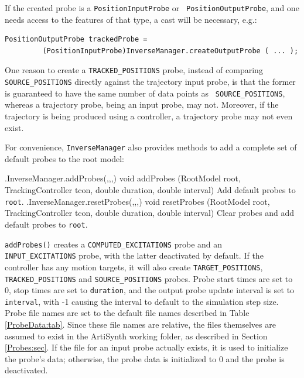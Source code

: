 If the created probe is a {\tt PositionInputProbe} or {\tt
PositionOutputProbe}, and one needs access to the features of that type, a cast
will be necessary, e.g.:
%
\begin{lstlisting}[]
      PositionOutputProbe trackedProbe = 
         (PositionInputProbe)InverseManager.createOutputProbe ( ... );
\end{lstlisting}
%

\begin{sideblock}
One reason to create a {\tt TRACKED\_POSITIONS} probe, instead of comparing
{\tt SOURCE\_POSITIONS} directly against the trajectory input probe, is that
the former is guaranteed to have the same number of data points as {\tt
SOURCE\_POSITIONS}, whereas a trajectory probe, being an input probe, may
not. Moreover, if the trajectory is being produced using a controller,
a trajectory probe may not even exist.
\end{sideblock}

For convenience, {\tt InverseManager} also provides methods to add a complete
set of default probes to the root model:
%
\begin{methodtable}{0.6}{0.4}
\midline
%
\methodentry
{\inverse.InverseManager.addProbes(,,,)}%
{void addProbes (RootModel root, TrackingController tcon,\brh
double duration, double interval)}%
{Add default probes to {\tt root}.}%
%
\methodspace{0.5em}%
\methodentry
{\inverse.InverseManager.resetProbes(,,,)}%
{void resetProbes (RootModel root, TrackingController tcon,\brh
double duration, double interval)}%
{Clear probes and add default probes to {\tt root}.}%
%
\midline
\end{methodtable}
%
{\tt addProbes()} creates a {\tt COMPUTED\_EXCITATIONS} probe and an {\tt
INPUT\_EXCITATIONS} probe, with the latter deactivated by default.  If the
controller has any motion targets, it will also create {\tt TARGET\_POSITIONS},
{\tt TRACKED\_POSITIONS} and {\tt SOURCE\_POSITIONS} probes.  Probe start times
are set to 0, stop times are set to {\tt duration}, and the output probe update
interval is set to {\tt interval}, with -1 causing the interval to default to
the simulation step size. Probe file names are set to the default file names
described in Table \ref{ProbeData:tab}.  Since these file names are relative,
the files themselves are assumed to exist in the ArtiSynth working folder, as
described in Section \ref{Probes:sec}. If the file for an input probe actually
exists, it is used to initialize the probe's data; otherwise, the probe data is
initialized to 0 and the probe is deactivated.

